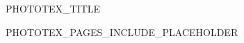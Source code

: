 \documentclass[11pt, a4paper, twoside, openright]{book}
\begin{document}
\pagestyle{empty}

\begin{titlepage}
  \begin{center}
    {\Huge PHOTOTEX_TITLE}
  \end{center}
\end{titlepage}
\clearpage%

PHOTOTEX_PAGES_INCLUDE_PLACEHOLDER

\mainmatter%

\end{document}
